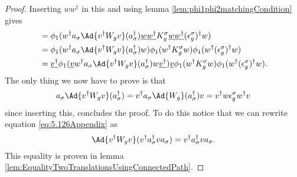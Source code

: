 \begin{proof}
	Inserting $w w^\dagger$ in this and using lemma \ref{lem:phi1phi2matchingCondition} gives
	\begin{align}
		&=\phi_1(w^\dagger a_\sigma \Ad{v^\dagger W_g v}(a_\sigma^\dagger)\underline{w w^\dagger}K_g^\sigma \underline{w w^\dagger}  (\epsilon_g^\sigma)^\dagger w)\\
		&=\phi_1(w^\dagger a_\sigma \Ad{v^\dagger W_g v}(a_\sigma^\dagger)w)\phi_1( w^\dagger K_g^\sigma w ) \phi_1( w^\dagger  (\epsilon_g^\sigma)^\dagger w)\\
		&=\underline{v^\dagger}\phi_1(\underline{v} w^\dagger a_\sigma \Ad{v^\dagger W_g v}(a_\sigma^\dagger)w \underline{v^\dagger})\underline{v}\phi_1( w^\dagger K_g^\sigma w ) \phi_1( w^\dagger  (\epsilon_g^\sigma)^\dagger w).
	\end{align}
	The only thing we now have to prove is that
	\begin{equation}\label{eq:5.126Appendix}
		a_\sigma \Ad{v^\dagger W_g v}(a_\sigma^\dagger)=v^\dagger a_\sigma \Ad{W_g}(a_\sigma^\dagger)v=v^\dagger w \epsilon_g^\sigma w^\dagger v
	\end{equation}
	since inserting this, concludes the proof. To do this notice that we can rewrite equation \eqref{eq:5.126Appendix} as
	\begin{equation}
		\Ad{v^\dagger W_g v}(v^\dagger a_\sigma^\dagger v a_\sigma)=v^\dagger a_\sigma^\dagger v a_\sigma.
	\end{equation}
	This equality is proven in lemma \ref{lem:EqualityTwoTranslationsUsingConnectedPath}.
\end{proof}

